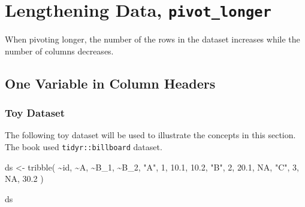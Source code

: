 \documentclass[
  letterpaper,
  DIV=11,
  numbers=noendperiod]{scrreprt}
\newenvironment{Shaded}{\begin{snugshade}}{\end{snugshade}}
\newcommand{\ConstantTok}[1]{\textcolor[rgb]{0.56,0.35,0.01}{#1}}
\newcommand{\DecValTok}[1]{\textcolor[rgb]{0.68,0.00,0.00}{#1}}
\newcommand{\FloatTok}[1]{\textcolor[rgb]{0.68,0.00,0.00}{#1}}
\newcommand{\FunctionTok}[1]{\textcolor[rgb]{0.28,0.35,0.67}{#1}}
\newcommand{\NormalTok}[1]{\textcolor[rgb]{0.00,0.23,0.31}{#1}}
\newcommand{\OtherTok}[1]{\textcolor[rgb]{0.00,0.23,0.31}{#1}}
\newcommand{\SpecialCharTok}[1]{\textcolor[rgb]{0.37,0.37,0.37}{#1}}
\newcommand{\StringTok}[1]{\textcolor[rgb]{0.13,0.47,0.30}{#1}}
\begin{document}
\section{\texorpdfstring{Lengthening Data,
\texttt{pivot\_longer}}{Lengthening Data, pivot\_longer}}\label{lengthening-data-pivot_longer}

\begin{tcolorbox}[enhanced jigsaw, opacityback=0, title=\textcolor{quarto-callout-note-color}{\faInfo}\hspace{0.5em}{`pivot\_longer' Idea}, colback=white, leftrule=.75mm, colbacktitle=quarto-callout-note-color!10!white, bottomrule=.15mm, colframe=quarto-callout-note-color-frame, arc=.35mm, bottomtitle=1mm, coltitle=black, toptitle=1mm, toprule=.15mm, opacitybacktitle=0.6, rightrule=.15mm, titlerule=0mm, breakable, left=2mm]

When pivoting longer, the number of the rows in the dataset increases
while the number of columns decreases.

\end{tcolorbox}

\subsection{One Variable in Column
Headers}\label{one-variable-in-column-headers}

\subsubsection{Toy Dataset}\label{toy-dataset}

The following toy dataset will be used to illustrate the concepts in
this section. The book used \texttt{tidyr::billboard} dataset.

\begin{Shaded}
\begin{Highlighting}[]
\NormalTok{ds }\OtherTok{\textless{}{-}} \FunctionTok{tribble}\NormalTok{(}
  \SpecialCharTok{\textasciitilde{}}\NormalTok{id, }\SpecialCharTok{\textasciitilde{}}\NormalTok{A, }\SpecialCharTok{\textasciitilde{}}\NormalTok{B\_1, }\SpecialCharTok{\textasciitilde{}}\NormalTok{B\_2,}
  \StringTok{"A"}\NormalTok{, }\DecValTok{1}\NormalTok{, }\FloatTok{10.1}\NormalTok{, }\FloatTok{10.2}\NormalTok{,}
  \StringTok{"B"}\NormalTok{, }\DecValTok{2}\NormalTok{, }\FloatTok{20.1}\NormalTok{, }\ConstantTok{NA}\NormalTok{,}
  \StringTok{"C"}\NormalTok{, }\DecValTok{3}\NormalTok{, }\ConstantTok{NA}\NormalTok{, }\FloatTok{30.2}
\NormalTok{)}

\NormalTok{ds}
\end{Highlighting}
\end{Shaded}
\end{document}
